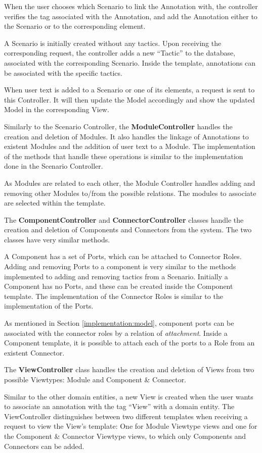 \documentclass[conference]{IEEEtran}
\begin{document}
When the user chooses which Scenario to link the Annotation with, the controller verifies the tag associated with the Annotation, and add the Annotation either to the Scenario or to the corresponding element. 

A Scenario is initially created without any tactics. Upon receiving the corresponding request, the controller adds a new ``Tactic'' to the database, associated with the corresponding Scenario. Inside the template, annotations can be associated with the specific tactics. 

When user text is added to a Scenario or one of its elements, a request is sent to this Controller. It will then update the Model accordingly and show the updated Model in the corresponding View.

Similarly to the Scenario Controller, the \textbf{ModuleController} handles the creation and deletion of Modules. It also handles the linkage of Annotations to existent Modules and the addition of user text to a Module. The implementation of the methods that handle these operations is similar to the implementation done in the Scenario Controller.

As Modules are related to each other, the Module Controller handles adding and removing other Modules to/from the possible relations. The modules to associate are selected within the template. 

The \textbf{ComponentController} and \textbf{ConnectorController} classes handle the creation and deletion of Components and Connectors from the system. The two classes have very similar methods.

A Component has a set of Ports, which can be attached to Connector Roles. Adding and removing Ports to a component is very similar to the methods implemented to adding and removing tactics from a Scenario. Initially a Component has no Ports, and these can be created inside the Component template. The implementation of the Connector Roles is similar to the implementation of the Ports.

As mentioned in Section \ref{implementation:model}, component ports can be associated with the connector roles by a relation of \textit{attachment}. Inside a Component template, it is possible to attach each of the ports to a Role from an existent Connector.

The \textbf{ViewController} class handles the creation and deletion of Views from two possible Viewtypes: Module and Component \& Connector. 

Similar to the other domain entities, a new View is created when the user wants to associate an annotation with the tag ``View'' with a domain entity.
The ViewController distinguishes between two different templates when receiving a request to view the View's template: One for Module Viewtype views and one for the Component \& Connector Viewtype views, to which only Components and Connectors can be added.
 
\end{document}
